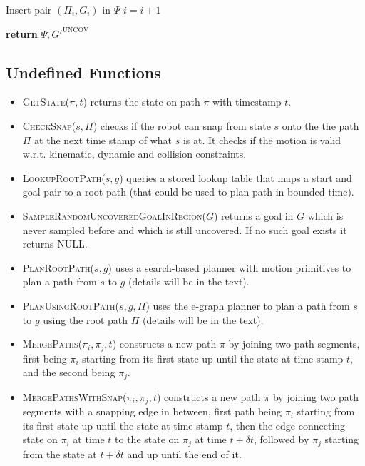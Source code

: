 {\begin{algorithm}
\begin{algorithmic}[1]
    \EndFor
    \State Insert pair $(\Pi_i, G_i)$ in $\Psi$
    \State $i = i + 1$

\EndWhile
\State \textbf{return} $\Psi, G'^{\textrm{UNCOV}}$
\end{algorithmic}
\end{algorithm}

\subsection*{Undefined Functions}
\begin{itemize}
  \item \textsc{GetState}($\pi,t$) returns the state on path $\pi$ with timestamp $t$.
  \item \textsc{CheckSnap}($s,\Pi$) checks if the robot can snap from state $s$ onto the the path $\Pi$ at the next time stamp of what $s$ is at. It checks if the motion is valid w.r.t. kinematic, dynamic and collision constraints.
  \item \textsc{LookupRootPath}($s,g$) queries a stored lookup table that maps a start and goal pair to a root path (that could be used to plan path in bounded time).
  \item \textsc{SampleRandomUncoveredGoalInRegion}($G$) returns a goal in $G$ which is never sampled before and which is still uncovered. If no such goal exists it returns NULL.
  \item \textsc{PlanRootPath}($s,g$) uses a search-based planner with motion primitives to plan a path from $s$ to $g$ (details will be in the text).
  \item \textsc{PlanUsingRootPath}($s,g,\Pi$) uses the e-graph planner to plan a path from $s$ to $g$ using the root path $\Pi$ (details will be in the text).
  \item \textsc{MergePaths}($\pi_i,\pi_j,t$) constructs a new path $\pi$ by joining two path segments, first being $\pi_i$ starting from its first state up until the state at time stamp $t$, and the second being $\pi_j$.
  \item \textsc{MergePathsWithSnap}($\pi_i,\pi_j,t$) constructs a new path $\pi$ by joining two path segments with a snapping edge in between, first path being $\pi_i$ starting from its first state up until the state at time stamp $t$, then the edge connecting state on $\pi_i$ at time $t$ to the state on $\pi_j$ at time $t + \delta t$, followed by $\pi_j$ starting from the state at $t + \delta t$ and up until the end of it.
\end{itemize}


}
